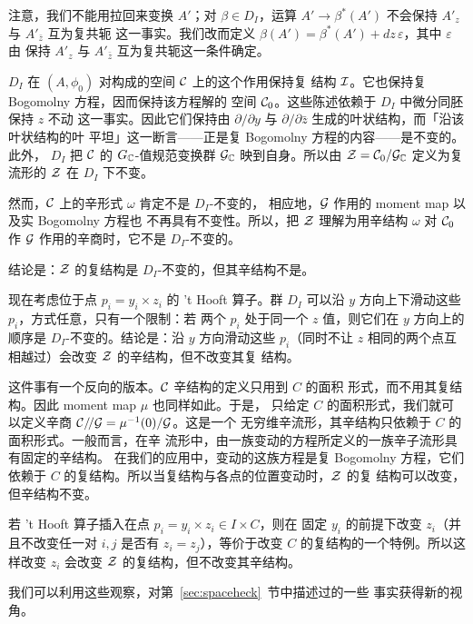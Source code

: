 注意，我们不能用拉回来变换 $A'$；对 $\beta\in D_I$，运算
$A'\to \beta^*(A')$ 不会保持 $A'_z$ 与 $A'_{\bar z}$ 互为复共轭
这一事实。我们改而定义
$\beta(A')=\beta^*(A')+dz\,\varepsilon$，其中 $\varepsilon$ 由
保持 $A'_z$ 与 $A'_{\bar z}$ 互为复共轭这一条件确定。

$D_I$ 在 $(A,\phi_0)$ 对构成的空间 ${\EUC}$ 上的这个作用保持复
结构 ${\cal I}$。它也保持复 Bogomolny 方程，因而保持该方程解的
空间 ${\EUC}_0$。这些陈述依赖于 $D_I$ 中微分同胚保持 $z$ 不动
这一事实。因此它们保持由 $\partial/\partial y$ 与
$\partial/\partial \bar z$ 生成的叶状结构，而「沿该叶状结构的叶
平坦」这一断言——正是复 Bogomolny 方程的内容——是不变的。此外，
$D_I$ 把 ${\EUC}$ 的 $G_{\Bbb{C}}$-值规范变换群
${\cal G}_{\Bbb{C}}$ 映到自身。所以由
${\EUZ}={\EUC}_0/{\cal G}_{\Bbb{C}}$ 定义为复流形的 ${\EUZ}$
在 $D_I$ 下不变。

然而，${\EUC}$ 上的辛形式 $\omega$ 肯定不是 $D_I$-不变的，
相应地，${\cal G}$ 作用的 moment map 以及实 Bogomolny 方程也
不再具有不变性。所以，把 ${\EUZ}$ 理解为用辛结构 $\omega$ 对
${\EUC}_0$ 作 ${\cal G}$ 作用的辛商时，它不是 $D_I$-不变的。

结论是：${\EUZ}$ 的复结构是 $D_I$-不变的，但其辛结构不是。

现在考虑位于点 $p_i=y_i\times z_i$ 的 't Hooft 算子。群 $D_I$
可以沿 $y$ 方向上下滑动这些 $p_i$，方式任意，只有一个限制：若
两个 $p_i$ 处于同一个 $z$ 值，则它们在 $y$ 方向上的顺序是
$D_I$-不变的。结论是：沿 $y$ 方向滑动这些 $p_i$（同时不让 $z$
相同的两个点互相越过）会改变 ${\EUZ}$ 的辛结构，但不改变其复
结构。

这件事有一个反向的版本。${\EUC}$ 辛结构的定义只用到 $C$ 的面积
形式，而不用其复结构。因此 moment map $\mu$ 也同样如此。于是，
只给定 $C$ 的面积形式，我们就可以定义辛商
${\EUC}/\negthinspace/{\cal G}=\mu^{-1}(0)/{\cal G}$。这是一个
无穷维辛流形，其辛结构只依赖于 $C$ 的面积形式。一般而言，在辛
流形中，由一族变动的方程所定义的一族辛子流形具有固定的辛结构。
在我们的应用中，变动的这族方程是复 Bogomolny 方程，它们依赖于
$C$ 的复结构。所以当复结构与各点的位置变动时，${\EUZ}$ 的复
结构可以改变，但辛结构不变。

若 't Hooft 算子插入在点 $p_i=y_i\times z_i\in I\times C$，则在
固定 $y_i$ 的前提下改变 $z_i$（并且不改变任一对 $i,j$ 是否有
$z_i=z_j$），等价于改变 $C$ 的复结构的一个特例。所以这样改变
$z_i$ 会改变 ${\EUZ}$ 的复结构，但不改变其辛结构。

\par{}

我们可以利用这些观察，对第~\ref{sec:spaceheck}~节中描述过的一些
事实获得新的视角。

